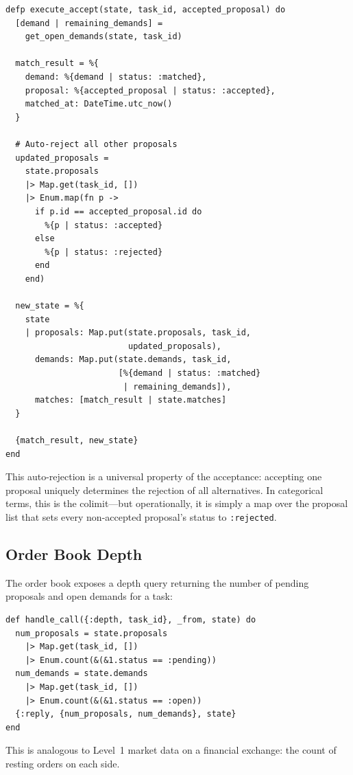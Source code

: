 \documentclass[12pt,a4paper]{article}
\theoremstyle{plain}
\theoremstyle{definition}
\begin{document}
\begin{lstlisting}[caption={Accept one, reject all others},label={lst:ob-accept}]
defp execute_accept(state, task_id, accepted_proposal) do
  [demand | remaining_demands] =
    get_open_demands(state, task_id)

  match_result = %{
    demand: %{demand | status: :matched},
    proposal: %{accepted_proposal | status: :accepted},
    matched_at: DateTime.utc_now()
  }

  # Auto-reject all other proposals
  updated_proposals =
    state.proposals
    |> Map.get(task_id, [])
    |> Enum.map(fn p ->
      if p.id == accepted_proposal.id do
        %{p | status: :accepted}
      else
        %{p | status: :rejected}
      end
    end)

  new_state = %{
    state
    | proposals: Map.put(state.proposals, task_id,
                         updated_proposals),
      demands: Map.put(state.demands, task_id,
                       [%{demand | status: :matched}
                        | remaining_demands]),
      matches: [match_result | state.matches]
  }

  {match_result, new_state}
end
\end{lstlisting}

This auto-rejection is a universal property of the acceptance: accepting one proposal uniquely determines the rejection of all alternatives. In categorical terms, this is the colimit---but operationally, it is simply a map over the proposal list that sets every non-accepted proposal's status to \texttt{:rejected}.

\subsection{Order Book Depth}

The order book exposes a depth query returning the number of pending proposals and open demands for a task:

\begin{lstlisting}[caption={Order book depth query},label={lst:ob-depth}]
def handle_call({:depth, task_id}, _from, state) do
  num_proposals = state.proposals
    |> Map.get(task_id, [])
    |> Enum.count(&(&1.status == :pending))
  num_demands = state.demands
    |> Map.get(task_id, [])
    |> Enum.count(&(&1.status == :open))
  {:reply, {num_proposals, num_demands}, state}
end
\end{lstlisting}

This is analogous to Level~1 market data on a financial exchange: the count of resting orders on each side.
\end{document}
